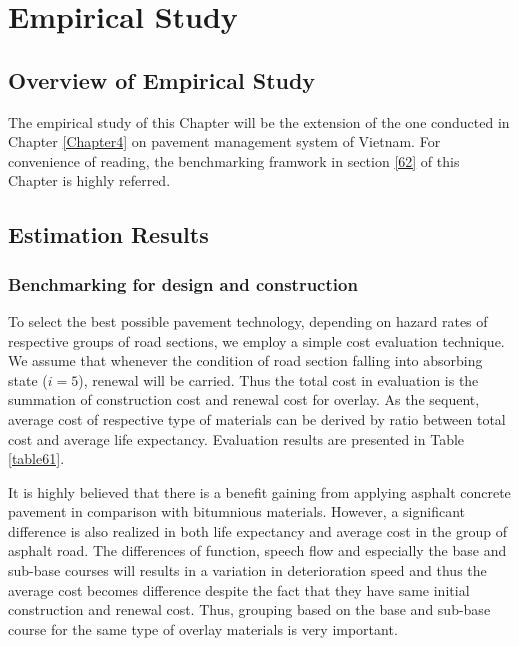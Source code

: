 \section{Empirical Study}
\label{64}
\subsection{Overview of Empirical Study}
\label{641}
The empirical study of this Chapter will be the extension of the one conducted in Chapter \ref{Chapter4} on pavement management system of Vietnam. For convenience of reading, the benchmarking framwork in section \ref{62} of this Chapter is highly referred.
\subsection{Estimation Results}
\label{642}
\subsubsection{Benchmarking for design and construction}
\label{6421}
To select the best possible pavement technology, depending on hazard rates of respective groups of road sections, we employ a simple cost evaluation technique. We assume that whenever the condition of road section falling into absorbing state ($i=5$), renewal will be carried. Thus the total cost in evaluation is the summation of construction cost and renewal cost for overlay. As the sequent, average cost of respective type of materials can be derived by ratio between total cost and average life expectancy. Evaluation results are presented in Table \ref{table61}. 

It is highly believed that there is a benefit gaining from applying asphalt concrete pavement in comparison with bitumnious materials. However, a significant difference is also realized in both life expectancy and average cost in the group of asphalt road. The differences of function, speech flow and especially the base and sub-base courses will results in a variation in deterioration speed and thus the average cost becomes difference despite the fact that they have same initial construction and renewal cost. Thus, grouping based on the base and sub-base course for the same type of overlay materials is very important. 

